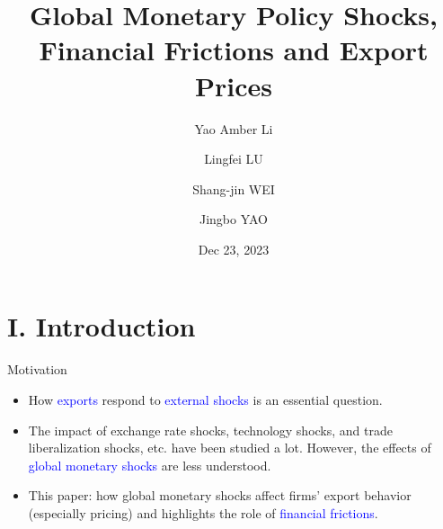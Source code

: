 \documentclass[10pt]{beamer}
\begin{document}
\title{Global Monetary Policy Shocks, \\Financial Frictions and Export Prices}



\author[Li, Lu, Wei and Yao]{Yao Amber Li \and Lingfei LU \and Shang-jin WEI \and Jingbo YAO} %


\date{Dec 23, 2023}

\begin{frame}
\maketitle
\centering
\end{frame}


\section{I. Introduction}

\begin{frame}{Motivation}

\begin{itemize}
    \item How \textcolor{blue}{exports} respond to \textcolor{blue}{external shocks} is an essential question.
    \medskip
    \item The impact of exchange rate shocks, technology shocks, and trade liberalization shocks, etc. have been studied a lot. However, the effects of \textcolor{blue}{global monetary shocks} are less understood.
    \medskip
    \item This paper: how global monetary shocks affect firms' export behavior (especially pricing) and highlights the role of \textcolor{blue}{financial frictions}.
\end{itemize}

    
\end{frame}
\end{document}
